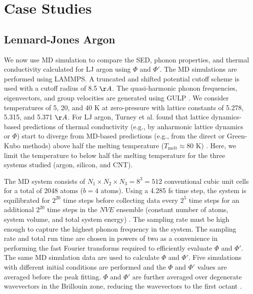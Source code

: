 \section{\label{S:Section_Prop}Case Studies}
\subsection{\label{S:Subsection_prop_LJ}Lennard-Jones Argon}
We now use MD simulation to compare the SED, phonon properties, and 
thermal conductivity 
calculated for LJ argon using $\Phi$ and $\Phi'$. The MD simulations are 
performed using 
LAMMPS.\cite{plimpton_fast_1995} A truncated and shifted
potential cutoff scheme is used with a cutoff radius of 8.5 $\AA$. The 
quasi-harmonic 
phonon frequencies, eigenvectors, and group velocities are generated 
using GULP \cite{gale_general_2003}.
 We consider temperatures of 5, 20, and 40 K at zero-pressure with lattice 
 constants of 
5.278, 5.315, and 5.371 $\AA$. For LJ argon, Turney et al. found that 
lattice dynamics-based 
predictions of thermal conductivity (e.g., by anharmonic lattice dynamics 
or $\Phi$) start to 
diverge from MD-based predictions (e.g., from the direct or Green-Kubo 
methods) above half the 
melting temperature ($T_{\mathrm{melt}} \approx 80$ K) 
\cite{turney_predicting_2009}. Here, we limit the 
temperature to below half the melting temperature for the three systems 
studied (argon, 
silicon, and CNT).

The MD system consists of $N_1 \times N_2 \times N_3 = 8^3 = 512$ 
conventional cubic unit 
cells for a total of 2048 atoms ($b=4$ atoms). Using a 4.285 fs time step, 
the system is 
equilibrated for $2^{20}$ time steps before collecting data every $2^5$ 
time steps for an 
additional $2^{20}$ time steps in the $NVE$ ensemble (constant number of 
atoms, system volume, 
and total system energy) \cite{mcquarrie_statistical_2000}. 
The sampling rate must be high enough to capture 
the highest phonon frequency in the system. The sampling rate and total 
run time are chosen in 
powers of two as a convenience in performing the fast Fourier transforms 
required to efficiently 
evaluate $\Phi$ and $\Phi'$. The same MD simulation data are used to 
calculate $\Phi$ and $\Phi'$.  
Five simulations with different initial conditions are performed and the 
$\Phi$ and $\Phi'$ 
values are averaged before the peak fitting. $\Phi$ and $\Phi'$ are further 
averaged over 
degenerate wavevectors in the Brillouin zone, reducing the wavevectors to 
the first octant 
\cite{mcgaughey_phonon_2004}.

